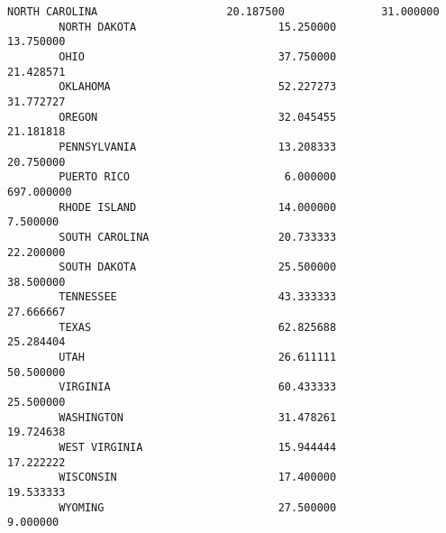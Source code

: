 \documentclass[11pt]{article}
\begin{document}
\begin{Verbatim}[commandchars=\\\{\}]
        NORTH CAROLINA                    20.187500               31.000000   
        NORTH DAKOTA                      15.250000               13.750000   
        OHIO                              37.750000               21.428571   
        OKLAHOMA                          52.227273               31.772727   
        OREGON                            32.045455               21.181818   
        PENNSYLVANIA                      13.208333               20.750000   
        PUERTO RICO                        6.000000              697.000000   
        RHODE ISLAND                      14.000000                7.500000   
        SOUTH CAROLINA                    20.733333               22.200000   
        SOUTH DAKOTA                      25.500000               38.500000   
        TENNESSEE                         43.333333               27.666667   
        TEXAS                             62.825688               25.284404   
        UTAH                              26.611111               50.500000   
        VIRGINIA                          60.433333               25.500000   
        WASHINGTON                        31.478261               19.724638   
        WEST VIRGINIA                     15.944444               17.222222   
        WISCONSIN                         17.400000               19.533333   
        WYOMING                           27.500000                9.000000   
        

\end{Verbatim}
\end{document}
